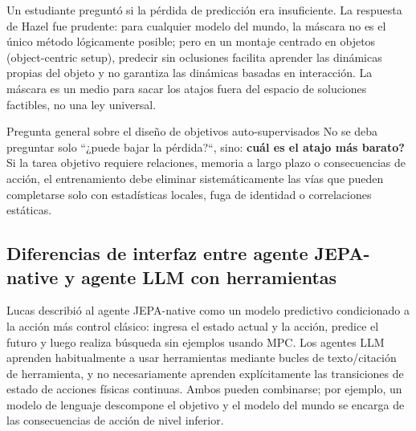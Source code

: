 \documentclass[a4paper]{article}
\begin{document}
Un estudiante preguntó si la pérdida de predicción era insuficiente. La respuesta de Hazel fue prudente: para cualquier modelo del mundo, la máscara no es el único método lógicamente posible; pero en un montaje centrado en objetos (object-centric setup), predecir sin oclusiones facilita aprender las dinámicas propias del objeto y no garantiza las dinámicas basadas en interacción. La máscara es un medio para sacar los atajos fuera del espacio de soluciones factibles, no una ley universal.


\begin{importantbox}{Pregunta general sobre el diseño de objetivos auto-supervisados}
No se deba preguntar solo ``¿puede bajar la pérdida?``, sino: \textbf{cuál es el atajo más barato?} Si la tarea objetivo requiere relaciones, memoria a largo plazo o consecuencias de acción, el entrenamiento debe eliminar sistemáticamente las vías que pueden completarse solo con estadísticas locales, fuga de identidad o correlaciones estáticas.
\end{importantbox}

\subsection{Diferencias de interfaz entre agente JEPA-native y agente LLM con herramientas}

Lucas describió al agente JEPA-native como un modelo predictivo condicionado a la acción más control clásico: ingresa el estado actual y la acción, predice el futuro y luego realiza búsqueda sin ejemplos usando MPC. Los agentes LLM aprenden habitualmente a usar herramientas mediante bucles de texto/citación de herramienta, y no necesariamente aprenden explícitamente las transiciones de estado de acciones físicas continuas. Ambos pueden combinarse; por ejemplo, un modelo de lenguaje descompone el objetivo y el modelo del mundo se encarga de las consecuencias de acción de nivel inferior.

\end{document}
